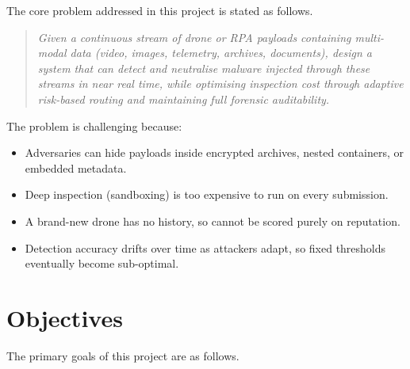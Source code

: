 \documentclass[12pt, a4paper]{report}
\begin{document}
The core problem addressed in this project is stated as follows.

\begin{quote}
\emph{Given a continuous stream of drone or RPA payloads containing
multi-modal data (video, images, telemetry, archives, documents), design a
system that can detect and neutralise malware injected through these streams
in near real time, while optimising inspection cost through adaptive
risk-based routing and maintaining full forensic auditability.}
\end{quote}

The problem is challenging because:

\begin{itemize}
    \item Adversaries can hide payloads inside encrypted archives, nested
          containers, or embedded metadata.
    \item Deep inspection (sandboxing) is too expensive to run on every
          submission.
    \item A brand-new drone has no history, so cannot be scored purely on
          reputation.
    \item Detection accuracy drifts over time as attackers adapt, so fixed
          thresholds eventually become sub-optimal.
\end{itemize}

\section{Objectives}

The primary goals of this project are as follows.
\end{document}
